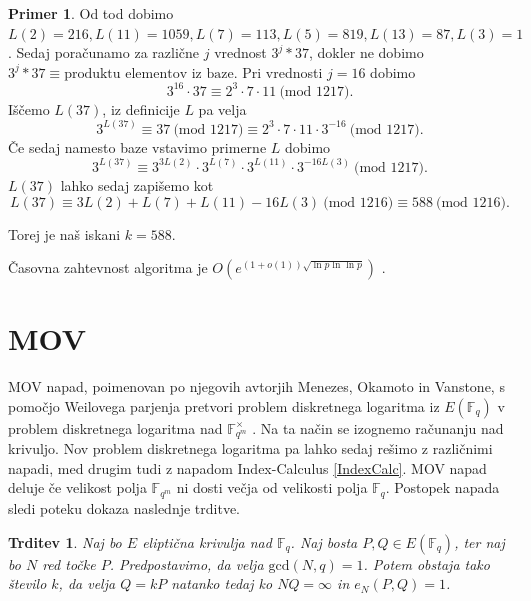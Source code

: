 \documentclass[12pt,a4paper,twoside]{article}
\theoremstyle{definition} %
\newtheorem{primer}[definicija]{Primer}
\theoremstyle{plain} %
\newtheorem{trditev}[definicija]{Trditev}
\numberwithin{equation}{section}  %
\newcommand{\F}{\mathbb F}
\newcommand{\MOD}[1]{\ \text{(mod }{#1}\text{)}}
\begin{document}
\begin{primer}
Od tod dobimo $L(2) = 216, L(11)=1059,L(7) = 113,L(5) = 819,L(13) = 87,L(3)=1$.
Sedaj poračunamo za različne $j$ vrednost $3^j*37$, dokler ne dobimo $3^j*37 \equiv \text{produktu elementov iz baze}$.
Pri vrednosti $j=16$ dobimo
$$3^{16}\cdot 37 \equiv 2^3\cdot 7 \cdot 11 \MOD{1217}.$$
Iščemo $L(37)$, iz definicije $L$ pa velja
$$3^{L(37)} \equiv 37 \MOD{1217} \equiv 2^3\cdot 7 \cdot 11 \cdot 3^{-16}\MOD{1217}.$$
Če sedaj namesto baze vstavimo primerne $L$ dobimo
$$3^{L(37)} \equiv 3^{3L(2)}\cdot 3^{L(7)} \cdot 3^{L(11)} \cdot 3^{-16L(3)}\MOD{1217}.$$
$L(37)$ lahko sedaj zapišemo kot
$$L(37) \equiv 3L(2) +L(7)+L(11) - 16L(3) \MOD{1216} \equiv 588 \MOD{1216}.$$

Torej je naš iskani $k=588$.

\end{primer}

Časovna zahtevnost algoritma je $O(e^{(1+o(1))\sqrt{\ln p \ln \ln p }})$ \cite{Stinson1995}.

%



\newpage

\section{MOV}
MOV napad, poimenovan po njegovih avtorjih Menezes, Okamoto in Vanstone, s pomočjo Weilovega parjenja pretvori problem diskretnega logaritma iz $E(\F_{q})$ v problem diskretnega logaritma nad $\F^{\times}_{q^m}$ \cite{Washington2008}. Na ta način se izognemo računanju nad krivuljo. Nov problem diskretnega logaritma pa lahko sedaj rešimo z različnimi napadi, med drugim tudi z napadom Index-Calculus \ref{IndexCalc}. MOV napad deluje če velikost polja $\F_{q^m}$ ni dosti večja od velikosti polja $\F_{q}$. Postopek napada sledi poteku dokaza naslednje trditve.

\begin{trditev}
\label{trd:5.1}
Naj bo $E$ eliptična krivulja nad $\F_{q}$. Naj bosta $P,Q \in E(\F_{q})$, ter naj bo $N$ red točke $P$. Predpostavimo, da velja $\text{gcd}(N,q)=1$. Potem obstaja tako število $k$, da velja $Q = kP$ natanko tedaj ko $NQ = \infty$ in $e_N(P,Q)=1$.
\end{trditev}
\end{document}
